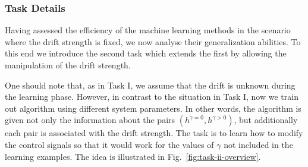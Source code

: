 \documentclass[aps,pra,showkeys,showpacs,notitlepage,superscriptaddress]{revtex4-1}
\newcommand{\1}{{\rm 1\hspace{-0.9mm}l}}
\newcommand{\NCP}{\ensuremath{h^{\gamma=0}}\xspace}
\newcommand{\DCP}{\ensuremath{h^{\gamma >0}}\xspace}
\begin{document}
\subsubsection{Task Details}

Having assessed the efficiency of the machine learning methods in the scenario where the drift strength is fixed, we now analyse their generalization abilities. To this end we introduce the second task which extends the first by allowing the manipulation of the drift strength.

One should note that, as in Task I, we assume that the drift is unknown during the learning phase. However, in contrast to the situation in Task I, now we train out algorithm using different system parameters. In other words, the algorithm is given not only the information about the pairs $(\NCP, \DCP)$, but additionally each pair is associated with the drift strength. The task is to learn how to modify the control signals so that it would work for the values of $\gamma$ not included in the learning examples. The idea is illustrated in Fig.~\ref{fig:task-ii-overview}.
\end{document}
